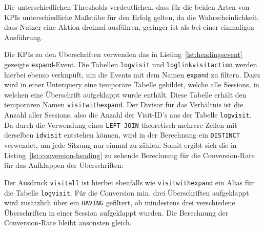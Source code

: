 Die unterschiedlichen Thresholds verdeutlichen, dass für die beiden Arten von KPIs unterschiedliche Maßstäbe für den Erfolg gelten, da die Wahrscheinlichkeit, dass Nutzer eine Aktion dreimal ausführen, geringer ist als bei einer einmaligen Ausführung.

Die KPIs zu den Überschriften verwenden das in Listing~\ref{lst:headingsevent} gezeigte \texttt{expand}-Event. Die Tabellen \texttt{log\textunderscore visit} und \texttt{log\textunderscore link\textunderscore visit\textunderscore action} werden hierbei ebenso verknpüft, um die Events mit dem Namen \texttt{expand} zu filtern.
Dazu wird in einer Unterquery eine temporäre Tabelle gebildet, welche alle Sessions, in welchen eine Überschrift aufgeklappt wurde enthält. Diese Tabelle erhält den temporären Namen \texttt{visit\textunderscore with\textunderscore expand}. Der Divisor für das Verhältnis ist die Anzahl aller Sessions, also die Anzahl der Visit-ID's aus der Tabelle \texttt{log\textunderscore visit}. Da durch die Verwendung eines \texttt{LEFT JOIN} theoretisch mehrere Zeilen mit derselben \texttt{idvisit} entstehen können, wird in der Berechnung ein \texttt{DISTINCT} verwendet, um jede Sitzung nur einmal zu zählen. Somit ergibt sich die in Listing~\ref{lst:conversion-heading} zu sehende Berechnung für die Conversion-Rate für das Aufklappen der Überschriften: 

\begin{figure}[H]
    \centering
    \begin{minipage}{\textwidth}
        
    \end{minipage}
\end{figure}

Der Ausdruck \texttt{visit\textunderscore all} ist hierbei ebenfalls wie \texttt{visit\textunderscore with\textunderscore expand} ein Alias für die Tabelle \texttt{log\textunderscore visit}. Für die Conversion \glqq min. drei Überschriften aufgeklappt\grqq{} wird zusätzlich über ein \texttt{HAVING} gefiltert, ob mindestens drei verschiedene Überschriften in einer Session aufgeklappt wurden. Die Berechnung der Conversion-Rate bleibt ansonsten gleich.

